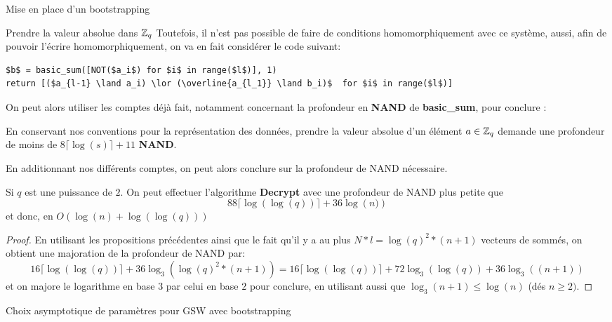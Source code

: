 \begin{section}{Mise en place d'un bootstrapping}
\begin{subsection}{Prendre la valeur absolue dans $\mathbb{Z}_q$}
	Toutefois, il n'est pas possible de faire de conditions homomorphiquement avec ce système, aussi, afin de pouvoir l'écrire homomorphiquement, on va en fait considérer le code suivant:

\vspace{0.5cm}
\begin{lstlisting}
$b$ = basic_sum([NOT($a_i$) for $i$ in range($l$)], 1)
return [($a_{l-1} \land a_i) \lor (\overline{a_{l_1}} \land b_i)$  for $i$ in range($l$)]
\end{lstlisting}

	On peut alors utiliser les comptes déjà fait, notamment concernant la profondeur en \textbf{NAND} de \textbf{basic\_sum}, pour conclure :

\begin{prop}
	En conservant nos conventions pour la représentation des données,
	prendre la valeur absolue d'un élément $a\in \mathbb{Z}_q$ demande une
	profondeur de moins de $8\lceil \log(s) \rceil + 11$ \textbf{NAND}.
\end{prop}
En additionnant nos différents comptes, on peut alors conclure sur la
profondeur de NAND nécessaire.
\begin{thm} \label{size_dec}
	Si $q$ est une puissance de $2$.
	On peut effectuer 
	l'algorithme \textbf{Decrypt} avec une profondeur de NAND plus petite que
	\[88 \lceil \log(\log(q)) \rceil + 36 \log\left(n)\right) \]
	et donc, en $O(\log(n) + \log(\log(q)))$
\end{thm}
\begin{proof}
En utilisant les propositions précédentes ainsi que le fait qu'il y a au plus $N*l = \log(q)^2 * (n+1)$ vecteurs de
sommés, on obtient une majoration de la profondeur de NAND par:
\[16 \lceil \log(\log(q)) \rceil + 36 \log_3\left(\log(q)^2
*(n+1)\right) = 16 \lceil \log(\log(q)) \rceil + 72 \log_3(\log(q)) + 36 \log_3\left((n+1)\right) \]
et on majore le logarithme en base $3$ par celui en base $2$ pour conclure, en
utilisant aussi que $\log_3(n+1) \leq \log(n)$ (dés $n \geq 2)$.
\end{proof}
\end{subsection}
\begin{subsection}{Choix asymptotique de paramètres pour GSW avec bootstrapping}
\label{sec:bootstrapping}






\end{subsection}
\end{section}
